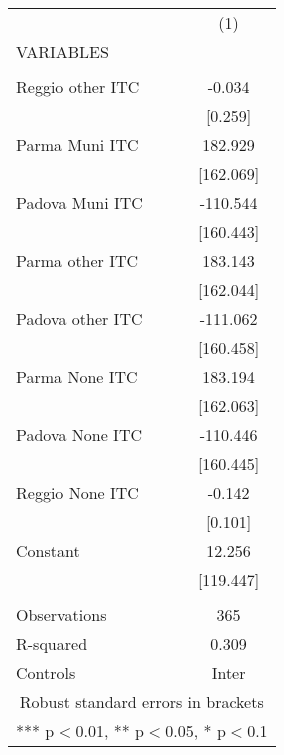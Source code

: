 \begin{tabular}{lc} \hline
 & (1) \\
VARIABLES &  \\ \hline
 &  \\
Reggio other ITC & -0.034 \\
 & [0.259] \\
Parma Muni ITC & 182.929 \\
 & [162.069] \\
Padova Muni ITC & -110.544 \\
 & [160.443] \\
Parma other ITC & 183.143 \\
 & [162.044] \\
Padova other ITC & -111.062 \\
 & [160.458] \\
Parma None ITC & 183.194 \\
 & [162.063] \\
Padova None ITC & -110.446 \\
 & [160.445] \\
Reggio None ITC & -0.142 \\
 & [0.101] \\
Constant & 12.256 \\
 & [119.447] \\
 &  \\
Observations & 365 \\
R-squared & 0.309 \\
 Controls & Inter \\ \hline
\multicolumn{2}{c}{ Robust standard errors in brackets} \\
\multicolumn{2}{c}{ *** p$<$0.01, ** p$<$0.05, * p$<$0.1} \\
\end{tabular}
